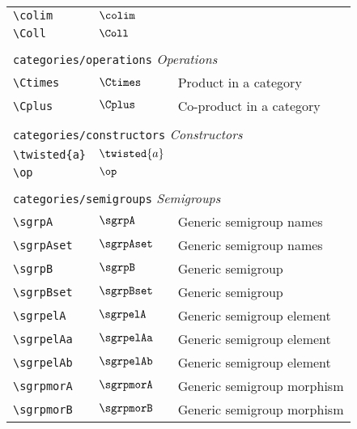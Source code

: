 \begin{longtable}{lll}
 {\color[rgb]{0.5,0.5,0.5}\texttt{\textbackslash colim}} & $\colim$ & \\ 
 {\color[rgb]{0.5,0.5,0.5}\texttt{\textbackslash Coll}} & $\Coll$ & \\ 
  &  & \\ 
 \multicolumn{3}{l}{{\color[rgb]{0.5,0.5,0.5}\texttt{categories/operations}} \emph{Operations}}\\ 
 \hline
{\color[rgb]{0.5,0.5,0.5}\texttt{\textbackslash Ctimes}} & $\Ctimes$ &  Product in a category\\ 
 {\color[rgb]{0.5,0.5,0.5}\texttt{\textbackslash Cplus}} & $\Cplus$ &  Co-product in a category\\ 
  &  & \\ 
 \multicolumn{3}{l}{{\color[rgb]{0.5,0.5,0.5}\texttt{categories/constructors}} \emph{Constructors}}\\ 
 \hline
{\color[rgb]{0.5,0.5,0.5}\texttt{\textbackslash twisted\{a\}}} & $\twisted{a}$ & \\ 
 {\color[rgb]{0.5,0.5,0.5}\texttt{\textbackslash op}} & $\op$ & \\ 
  &  & \\ 
 \multicolumn{3}{l}{{\color[rgb]{0.5,0.5,0.5}\texttt{categories/semigroups}} \emph{Semigroups}}\\ 
 \hline
{\color[rgb]{0.5,0.5,0.5}\texttt{\textbackslash sgrpA}} & $\sgrpA$ &  Generic semigroup names\\ 
 {\color[rgb]{0.5,0.5,0.5}\texttt{\textbackslash sgrpAset}} & $\sgrpAset$ &  Generic semigroup names\\ 
 {\color[rgb]{0.5,0.5,0.5}\texttt{\textbackslash sgrpB}} & $\sgrpB$ &  Generic semigroup\\ 
 {\color[rgb]{0.5,0.5,0.5}\texttt{\textbackslash sgrpBset}} & $\sgrpBset$ &  Generic semigroup\\ 
 {\color[rgb]{0.5,0.5,0.5}\texttt{\textbackslash sgrpelA}} & $\sgrpelA$ &  Generic semigroup element\\ 
 {\color[rgb]{0.5,0.5,0.5}\texttt{\textbackslash sgrpelAa}} & $\sgrpelAa$ &  Generic semigroup element\\ 
 {\color[rgb]{0.5,0.5,0.5}\texttt{\textbackslash sgrpelAb}} & $\sgrpelAb$ &  Generic semigroup element\\ 
 {\color[rgb]{0.5,0.5,0.5}\texttt{\textbackslash sgrpmorA}} & $\sgrpmorA$ &  Generic semigroup morphism\\ 
 {\color[rgb]{0.5,0.5,0.5}\texttt{\textbackslash sgrpmorB}} & $\sgrpmorB$ &  Generic semigroup morphism\\ 

\end{longtable}
